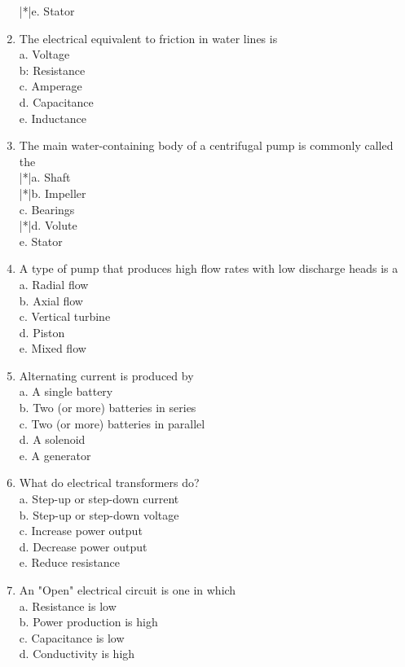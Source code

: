 \begin{enumerate}[1.]
|*|e. Stator\\
\item The electrical equivalent to friction in water lines is\\
a. Voltage\\
b: Resistance\\
c. Amperage\\
d. Capacitance\\
e. Inductance\\
\item The main water-containing body of a centrifugal pump is commonly called the\\
|*|a. Shaft\\
|*|b. Impeller\\
c. Bearings\\
|*|d. Volute\\
e. Stator\\
\item A type of pump that produces high flow rates with low discharge heads is a\\
a. Radial flow\\
b. Axial flow\\
c. Vertical turbine\\
d. Piston\\
e. Mixed flow\\
\item Alternating current is produced by\\
a. A single battery\\
b. Two (or more) batteries in series\\
c. Two (or more) batteries in parallel\\
d. A solenoid\\
e. A generator\\
\item What do electrical transformers do?\\
a. Step-up or step-down current\\
b. Step-up or step-down voltage\\
c. Increase power output\\
d. Decrease power output\\
e. Reduce resistance
\item An "Open" electrical circuit is one in which\\
a. Resistance is low\\
b. Power production is high\\
c. Capacitance is low\\
d. Conductivity is high\\

\end{enumerate}

